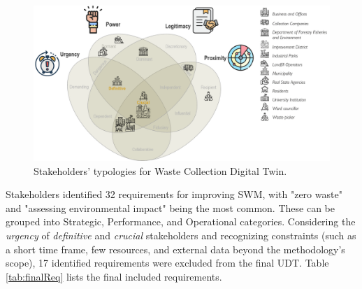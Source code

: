 \documentclass[authoryear,preprint,review,doubleblind, 12pt]{elsarticle}
\begin{document}
    \begin{figure}[htb]
    \centering
    \includegraphics[width=1.2\linewidth]{Figures/Stakeholders map.png}
        \caption{Stakeholders’ typologies for Waste Collection Digital Twin.}
        \label{fig:typologies}
    \end{figure}

    Stakeholders identified 32 requirements for improving SWM, with "zero waste" and "assessing environmental impact" being the most common. These can be grouped into Strategic, Performance, and Operational categories. Considering the \textit{urgency} of \textit{definitive} and \textit{crucial} stakeholders and recognizing constraints (such as a short time frame, few resources, and external data beyond the methodology's scope), 17 identified requirements were excluded from the final UDT. Table \ref{tab:finalReq} lists the final included requirements.
\end{document}
